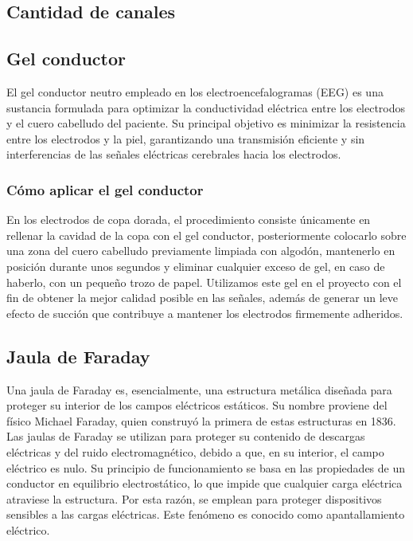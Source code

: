 \documentclass{article}
\begin{document}
\subsection{Cantidad de canales}

\subsection{Gel conductor}
El gel conductor neutro empleado en los electroencefalogramas (EEG) es una sustancia formulada para optimizar la conductividad eléctrica entre los electrodos y el cuero cabelludo del paciente. Su principal objetivo es minimizar la resistencia entre los electrodos y la piel, garantizando una transmisión eficiente y sin interferencias de las señales eléctricas cerebrales hacia los electrodos. 

\subsubsection{Cómo aplicar el gel conductor}
En los electrodos de copa dorada, el procedimiento consiste únicamente en rellenar la cavidad de la copa con el gel conductor, posteriormente colocarlo sobre una zona del cuero cabelludo previamente limpiada con algodón, mantenerlo en posición durante unos segundos y eliminar cualquier exceso de gel, en caso de haberlo, con un pequeño trozo de papel. Utilizamos este gel en el proyecto con el fin de obtener la mejor calidad posible en las señales, además de generar un leve efecto de succión que contribuye a mantener los electrodos firmemente adheridos.

\subsection{Jaula de Faraday}
Una jaula de Faraday es, esencialmente, una estructura metálica diseñada para proteger su interior de los campos eléctricos estáticos. Su nombre proviene del físico Michael Faraday, quien construyó la primera de estas estructuras en 1836. Las jaulas de Faraday se utilizan para proteger su contenido de descargas eléctricas y del ruido electromagnético, debido a que, en su interior, el campo eléctrico es nulo. Su principio de funcionamiento se basa en las propiedades de un conductor en equilibrio electrostático, lo que impide que cualquier carga eléctrica atraviese la estructura. Por esta razón, se emplean para proteger dispositivos sensibles a las cargas eléctricas. Este fenómeno es conocido como apantallamiento eléctrico.
\end{document}
